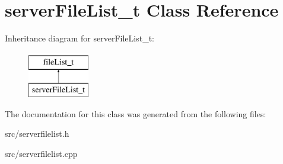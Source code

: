 \hypertarget{classserverFileList__t}{\section{server\-File\-List\-\_\-t \-Class \-Reference}
\label{classserverFileList__t}
}
\-Inheritance diagram for server\-File\-List\-\_\-t\-:\begin{figure}[H]
\begin{center}
\leavevmode
\includegraphics[height=2.000000cm]{classserverFileList__t}
\end{center}
\end{figure}


\-The documentation for this class was generated from the following files\-:\begin{DoxyCompactItemize}
\item 
src/serverfilelist.\-h\item 
src/serverfilelist.\-cpp\end{DoxyCompactItemize}
